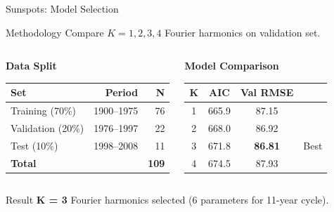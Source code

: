 \documentclass[9pt, aspectratio=169, t]{beamer}
\begin{document}
\begin{frame}{Sunspots: Model Selection}
    \begin{block}{Methodology}
        Compare $K = 1, 2, 3, 4$ Fourier harmonics on validation set.
    \end{block}

    \vspace{0.2cm}

    \begin{columns}[T]
        \begin{center}
        \textbf{Data Split}
        \begin{tabular}{lrr}
            \toprule
            \textbf{Set} & \textbf{Period} & \textbf{N} \\
            \midrule
            Training (70\%) & 1900--1975 & 76 \\
            Validation (20\%) & 1976--1997 & 22 \\
            Test (10\%) & 1998--2008 & 11 \\
            \midrule
            \textbf{Total} & & \textbf{109} \\
            \bottomrule
        \end{tabular}
        \end{center}

        \begin{center}
        \textbf{Model Comparison}
        \begin{tabular}{cccc}
            \toprule
            \textbf{K} & \textbf{AIC} & \textbf{Val RMSE} & \\
            \midrule
            1 & 665.9 & 87.15 & \\
            2 & 668.0 & 86.92 & \\
            \rowcolor{Forest!20} 3 & 671.8 & \textbf{86.81} & Best \\
            4 & 674.5 & 87.93 & \\
            \bottomrule
        \end{tabular}
        \end{center}
    \end{columns}

    \vspace{0.3cm}

    \begin{exampleblock}{Result}
        \textbf{K = 3} Fourier harmonics selected (6 parameters for 11-year cycle).
    \end{exampleblock}
\end{frame}
\end{document}

